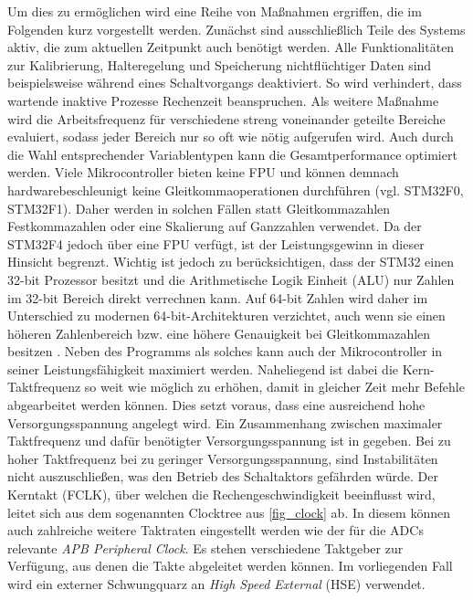 Um dies zu ermöglichen wird eine Reihe von Maßnahmen ergriffen, die im Folgenden kurz vorgestellt werden.
Zunächst sind ausschließlich Teile des Systems aktiv, die zum aktuellen Zeitpunkt auch benötigt werden. Alle Funktionalitäten zur Kalibrierung, Halteregelung und Speicherung nichtflüchtiger Daten sind beispielsweise während eines Schaltvorgangs deaktiviert. So wird verhindert, dass wartende inaktive Prozesse Rechenzeit beanspruchen.
Als weitere Maßnahme wird die Arbeitsfrequenz für verschiedene streng voneinander geteilte Bereiche evaluiert, sodass jeder Bereich nur so oft wie nötig aufgerufen wird.
Auch durch die Wahl entsprechender Variablentypen kann die Gesamtperformance optimiert werden. Viele Mikrocontroller bieten keine FPU und können demnach hardwarebeschleunigt keine Gleitkommaoperationen durchführen (vgl. STM32F0, STM32F1). Daher werden in solchen Fällen statt Gleitkommazahlen Festkommazahlen oder eine Skalierung auf Ganzzahlen verwendet. Da der STM32F4 jedoch über eine FPU verfügt, ist der Leistungsgewinn in dieser Hinsicht begrenzt. Wichtig ist jedoch zu berücksichtigen, dass der STM32 einen 32-bit Prozessor besitzt und die Arithmetische Logik Einheit (ALU) nur Zahlen im 32-bit Bereich direkt verrechnen kann. Auf 64-bit Zahlen wird daher im Unterschied zu modernen 64-bit-Architekturen verzichtet, auch wenn sie einen höheren Zahlenbereich bzw. eine höhere Genauigkeit bei Gleitkommazahlen besitzen \cite{stm32}.
Neben des Programms als solches kann auch der Mikrocontroller in seiner Leistungsfähigkeit maximiert werden. Naheliegend ist dabei die Kern-Taktfrequenz so weit wie möglich zu erhöhen, damit in gleicher Zeit mehr Befehle abgearbeitet werden können. Dies setzt voraus, dass eine ausreichend hohe Versorgungsspannung angelegt wird. Ein Zusammenhang zwischen maximaler Taktfrequenz und dafür benötigter Versorgungsspannung ist in \cite{stm32}gegeben. Bei zu hoher Taktfrequenz bei zu geringer Versorgungsspannung, sind Instabilitäten nicht auszuschließen, was den Betrieb des Schaltaktors gefährden würde. Der Kerntakt (FCLK), über welchen die Rechengeschwindigkeit beeinflusst wird, leitet sich aus dem sogenannten Clocktree aus \autoref{fig_clock} ab. In diesem können auch zahlreiche weitere Taktraten eingestellt werden wie der für die ADCs relevante \textit{APB Peripheral Clock}. Es stehen verschiedene Taktgeber zur Verfügung, aus denen die Takte abgeleitet werden können. Im vorliegenden Fall wird ein externer Schwungquarz an \textit{High Speed External} (HSE) verwendet. \cite{stmref} \\

